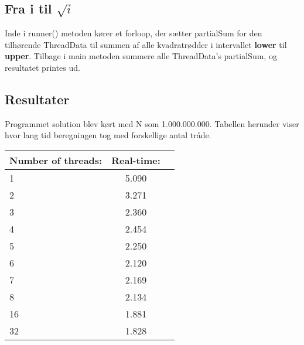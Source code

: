 \subsection{Fra i til $\sqrt{i}$}
Inde i runner() metoden kører et forloop, der sætter partialSum for den tilhørende ThreadData til summen af alle kvadratrødder i intervallet \textbf{lower} til \textbf{upper}. Tilbage i main metoden summere alle ThreadData's partialSum, og resultatet printes ud.

\subsection{Resultater}
Programmet solution blev kørt med N som 1.000.000.000. Tabellen herunder viser hvor lang tid beregningen tog med forskellige antal tråde.

\begin{center}
  \begin{tabular}{ | l | c | r | }
    \hline
    \textbf{Number of threads:} & \textbf{Real-time:} \\ \hline
    1 & 5.090 \\ \hline
	2 & 3.271 \\ \hline
	3 & 2.360 \\ \hline
	4 & 2.454 \\ \hline
	5 & 2.250 \\ \hline
	6 & 2.120 \\ \hline
	7 & 2.169 \\ \hline
	8 & 2.134 \\ \hline
	16 & 1.881 \\ \hline
	32 & 1.828 \\ \hline
  \end{tabular}
\end{center}